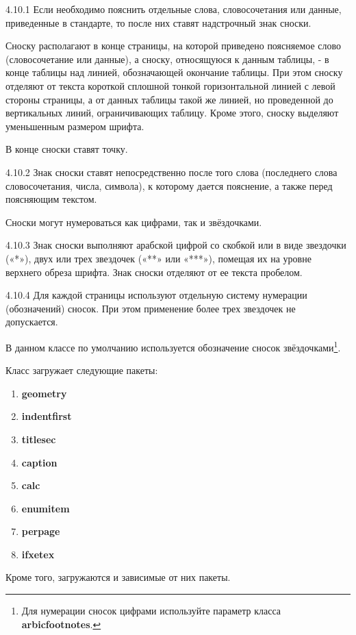 \documentclass[12pt, twoside, final]{ruost}
\begin{document}
\begin{OST}
				\begin{stdquote}
					\par 4.10.1 Если необходимо пояснить отдельные слова, словосочетания или данные, приведенные в стандарте, то после них ставят надстрочный знак сноски.
					\par Сноску располагают в конце страницы, на которой приведено поясняемое слово (словосочетание или данные), а сноску, относящуюся к данным таблицы, - в конце таблицы над линией, обозначающей окончание таблицы. При этом сноску отделяют от текста короткой сплошной тонкой горизонтальной линией с левой стороны страницы, а от данных таблицы такой же линией, но проведенной до вертикальных линий, ограничивающих таблицу. Кроме этого, сноску выделяют уменьшенным размером шрифта.
					\par В конце сноски ставят точку.
					\par 4.10.2 Знак сноски ставят непосредственно после того слова (последнего слова словосочетания, числа, символа), к которому дается пояснение, а также перед поясняющим текстом.
					\par [ГОСТ 1.5---2001]
				\end{stdquote}
				
				\point\label{pnt:numfootnotes} Сноски могут нумероваться как цифрами, так и звёздочками.
				
				\begin{stdquote}
					\par 4.10.3 Знак сноски выполняют арабской цифрой со скобкой или в виде звездочки («*»), двух или трех звездочек («**» или «***»), помещая их на уровне верхнего обреза шрифта. Знак сноски отделяют от ее текста пробелом.
					\par 4.10.4 Для каждой страницы используют отдельную систему нумерации (обозначений) сносок. При этом применение более трех звездочек не допускается.
					\par [ГОСТ 1.5---2001]
				\end{stdquote}
				
				\point В данном классе по умолчанию используется обозначение сносок звёздочками\footnote{Для нумерации сносок цифрами используйте параметр класса \textbf{arbicfootnotes}.}.
					
				
		
			\point Класс загружает следующие пакеты:
				\begin{enumerate}
					\item \textbf{geometry}
					\item \textbf{indentfirst}
					\item \textbf{titlesec}
					\item \textbf{caption}
					\item \textbf{calc}
					\item \textbf{enumitem}
					\item \textbf{perpage}
					\item \textbf{ifxetex}
				\end{enumerate}
				\subpoint Кроме того, загружаются и зависимые от них пакеты.
			

\end{OST}
\end{document}
